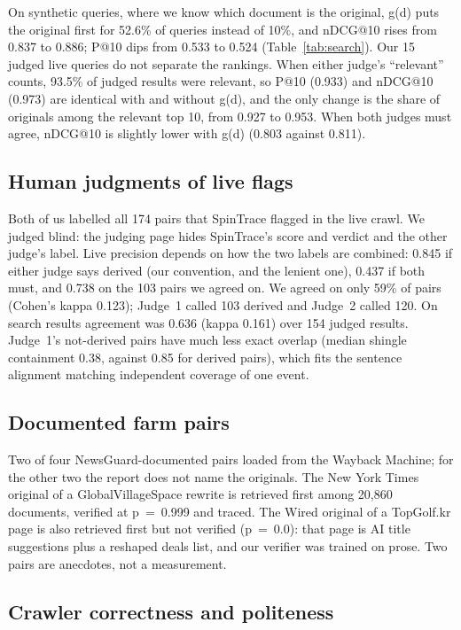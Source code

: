 \documentclass[11pt,a4paper]{article}
\begin{document}
On synthetic queries, where we know which document is the original, g(d) puts the original first for 52.6\% of queries instead of 10\%, and nDCG@10 rises from 0.837 to 0.886; P@10 dips from 0.533 to 0.524 (Table~\ref{tab:search}). Our 15 judged live queries do not separate the rankings. When either judge's ``relevant'' counts, 93.5\% of judged results were relevant, so P@10 (0.933) and nDCG@10 (0.973) are identical with and without g(d), and the only change is the share of originals among the relevant top 10, from 0.927 to 0.953. When both judges must agree, nDCG@10 is slightly lower with g(d) (0.803 against 0.811).

\subsection{Human judgments of live flags}

Both of us labelled all 174 pairs that SpinTrace flagged in the live crawl. We judged blind: the judging page hides SpinTrace's score and verdict and the other judge's label. Live precision depends on how the two labels are combined: 0.845 if either judge says derived (our convention, and the lenient one), 0.437 if both must, and 0.738 on the 103 pairs we agreed on. We agreed on only 59\% of pairs (Cohen's kappa 0.123); Judge~1 called 103 derived and Judge~2 called 120. On search results agreement was 0.636 (kappa 0.161) over 154 judged results. Judge~1's not-derived pairs have much less exact overlap (median shingle containment 0.38, against 0.85 for derived pairs), which fits the sentence alignment matching independent coverage of one event.

\subsection{Documented farm pairs}

Two of four NewsGuard-documented pairs loaded from the Wayback Machine; for the other two the report does not name the originals. The New York Times original of a GlobalVillageSpace rewrite is retrieved first among 20,860 documents, verified at p~=~0.999 and traced. The Wired original of a TopGolf.kr page is also retrieved first but not verified (p~=~0.0): that page is AI title suggestions plus a reshaped deals list, and our verifier was trained on prose. Two pairs are anecdotes, not a measurement.

\subsection{Crawler correctness and politeness}
\end{document}
